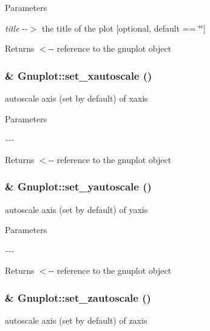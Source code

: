 \begin{DoxyParams}{Parameters}
\item[{\em title}]-\/-\/$>$ the title of the plot \mbox{[}optional, default == \char`\"{}\char`\"{}\mbox{]}\end{DoxyParams}
\begin{DoxyReturn}{Returns}
$<$-\/-\/ reference to the gnuplot object 
\end{DoxyReturn}
\hypertarget{class_gnuplot_a11a62a04c203f01607c3c21a727e318d}{
\subsubsection[{set\_\-xautoscale}]{\& Gnuplot::set\_\-xautoscale ()}}
\label{class_gnuplot_a11a62a04c203f01607c3c21a727e318d}
autoscale axis (set by default) of xaxis


\begin{DoxyParams}{Parameters}
\item[{\em -\/-\/-\/}]\end{DoxyParams}
\begin{DoxyReturn}{Returns}
$<$-\/-\/ reference to the gnuplot object 
\end{DoxyReturn}
\hypertarget{class_gnuplot_a5b9e1a4e68f94d418a8e9194f168b448}{
\subsubsection[{set\_\-yautoscale}]{\& Gnuplot::set\_\-yautoscale ()}}
\label{class_gnuplot_a5b9e1a4e68f94d418a8e9194f168b448}
autoscale axis (set by default) of yaxis


\begin{DoxyParams}{Parameters}
\item[{\em -\/-\/-\/}]\end{DoxyParams}
\begin{DoxyReturn}{Returns}
$<$-\/-\/ reference to the gnuplot object 
\end{DoxyReturn}
\hypertarget{class_gnuplot_aef3e84e793836158e1ddd773d1465c37}{
\subsubsection[{set\_\-zautoscale}]{\& Gnuplot::set\_\-zautoscale ()}}
\label{class_gnuplot_aef3e84e793836158e1ddd773d1465c37}
autoscale axis (set by default) of zaxis


